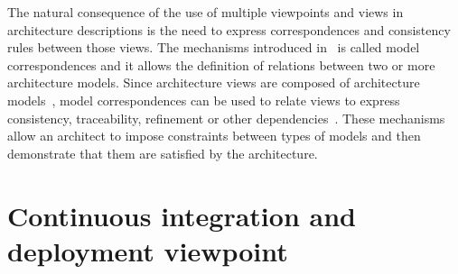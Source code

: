 


The natural consequence of the use of multiple viewpoints and views in architecture
descriptions is the need to express correspondences and consistency rules between those views.
The mechanisms introduced in~\cite{42010} is called model correspondences and it allows the definition of relations between
two or more architecture models. Since architecture views are composed of architecture models~\cite{42010}, model correspondences can be used to
relate views to express consistency, traceability, refinement or other dependencies~\cite{Emery-Hilliard:2009}.
These mechanisms allow an architect to impose constraints between types of models and then demonstrate that them
are satisfied by the architecture. 



%
%
%


\section{Continuous integration and deployment viewpoint}\label{sec:CIDviewpoint}

